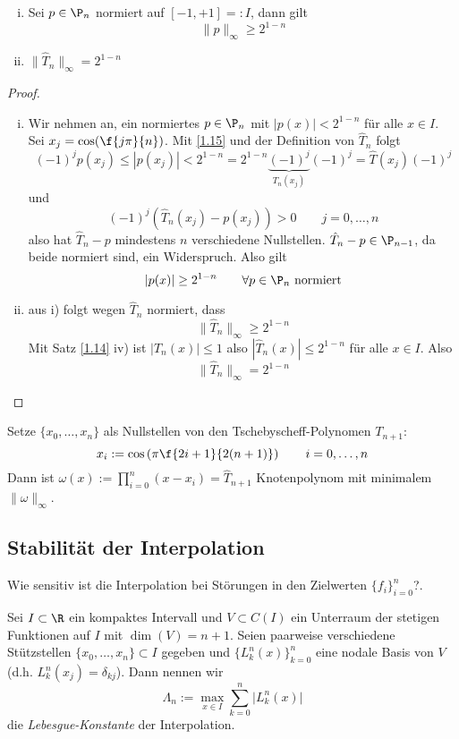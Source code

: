 \documentclass[11pt]{scrbook}
\begin{document}
\begin{st}[Optimalität]
	\label{1.15}
	\begin{enumerate}[i)]
		\item 
			Sei $p\in \P_n$ normiert auf $[-1,+1] =: I$, dann gilt
			\[
				\|p\|_\infty \ge 2^{1-n}
			\]
		\item
			$\displaystyle \|\hat T_n \|_\infty = 2^{1-n}$
	\end{enumerate}
	\begin{proof}
		\begin{enumerate}[i)]
			\item 
				Wir nehmen an, ein normiertes $p\in \P_n$ mit $|p(x)|<2^{1-n}$ für alle $x\in I$.
				Sei $x_j= \cos(\f {j\pi}{n})$.
				Mit \ref{1.15} und der Definition von $\hat T_n$ folgt
				\[
					(-1)^j p(x_j) \le |p(x_j)| < 2^{1-n} = 2^{1-n}\underbrace{(-1)^j}_{T_n(x_j)}(-1)^j = \hat T(x_j)(-1)^j
				\]
				und
				\[
					(-1)^j(\hat T_n(x_j)-p(x_j)) > 0 \qquad j=0,\dotsc,n
				\]
				also hat $\hat T_n -p$ mindestens $n$ verschiedene Nullstellen. $\hat T_n-p\in \P_{n-1}$, da beide normiert sind, ein Widerspruch.
				Also gilt
				\[
					|p(x)| \ge 2^{1-n} \qquad \forall p\in \P_n \text{ normiert}
				\]
			\item
				aus i) folgt wegen $\hat T_n$ normiert, dass
				\[
					\|\hat T_n\|_\infty \ge 2^{1-n}
				\]
				Mit Satz \ref{1.14} iv) ist $|T_n(x)| \le 1$ also $|\hat T_n(x)| \le 2^{1-n}$ für alle $x\in I$.
				Also 
				\[
					\|\hat T_n\|_\infty = 2^{1-n}
				\]
		\end{enumerate}
	\end{proof}
\end{st}

\begin{kor}
	\label{1.16}
	Setze $\{x_0,\dotsc,x_n\}$ als Nullstellen von den Tschebyscheff-Polynomen $T_{n+1}$:
	\[
		x_i := \cos\left(\pi\f{2i+1}{2(n+1)}\right) \qquad i=0,\dotsc,n
	\]
	Dann ist $\omega(x) := \prod_{i=0}^n (x-x_i) = \hat T_{n+1}$ Knotenpolynom mit minimalem $\|\omega\|_\infty$.
\end{kor}


\subsection{Stabilität der Interpolation}


Wie sensitiv ist die Interpolation bei Störungen in den Zielwerten $\{f_i\}_{i=0}^n$?.

\begin{df} \label{1.17}
	Sei $I\subset \R$ ein kompaktes Intervall und $V\subset C(I)$ ein Unterraum der stetigen Funktionen auf $I$ mit $\dim(V)=n+1$.
	Seien paarweise verschiedene Stützstellen $\{x_0,\dotsc, x_n\}\subset I$ gegeben und $\{L_k^n(x)\}_{k=0}^n$ eine nodale Basis von $V$ (d.h. $L_k^n(x_j) = \delta_{kj}$).
	Dann nennen wir
	\[
		\Lambda_n := \max_{x\in I}\sum_{k=0}^n \big|L_k^n(x)\big|
	\]
	die \emph{Lebesgue-Konstante} der Interpolation.
\end{df}
\end{document}
